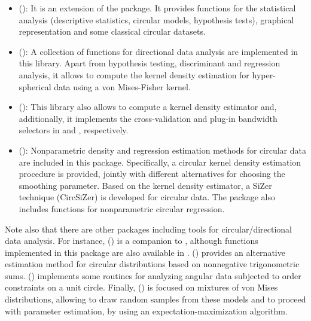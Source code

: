 \begin{itemize}
	\item {} (\citealp{agostinelli2013r}): It is an extension of the  package. It provides functions for the statistical analysis (descriptive statistics, circular models, hypothesis tests), graphical representation and some classical circular datasets.
	\item {} (\citealp{tsagris2017package}): A collection of functions for directional data analysis are implemented in this library. Apart from hypothesis testing, discriminant and regression analysis, it allows to compute the kernel density estimation for hyper-spherical data using a von Mises-Fisher kernel. 
	\item {} (\citealp{dd}): This library also allows to compute a kernel density estimator and, additionally, it implements the cross-validation and plug-in bandwidth selectors in \cite{hall1987kernel} and \cite{garcia2013exact}, respectively.
	\item {} (\citealp{oli2014}): Nonparametric density and regression estimation methods for circular data are included in this package. Specifically, a circular kernel density estimation procedure is provided, jointly with different alternatives for choosing the smoothing parameter. Based on the kernel density estimator, a SiZer technique (CircSiZer) is developed for circular data. The package also includes functions for nonparametric circular regression.
\end{itemize}

 


Note also that there are other packages including tools for circular/directional data analysis. For instance,  (\citealp{lundcircstats}) is a companion to \cite{jammalamadaka2001topics}, although functions	implemented in this package are also available in .  (\citealp{fernandez2013circnntsr}) provides an alternative estimation method for circular distributions based on nonnegative trigonometric sums.  (\citealp{barragan2013isocir}) implements some routines for analyzing angular data subjected to order constraints on a unit circle. Finally,   (\citealp{hornik2014movmf}) is focused on mixtures of von Mises distributions, allowing to draw random samples from these models and to proceed with parameter estimation, by using an expectation-maximization algorithm.




